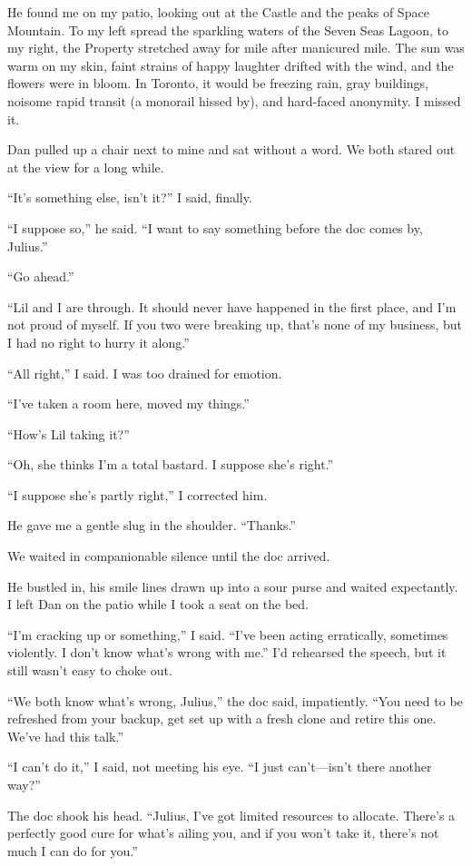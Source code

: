 He found me on my patio, looking out at the Castle and the peaks of
Space Mountain. To my left spread the sparkling waters of the Seven
Seas Lagoon, to my right, the Property stretched away for mile
after manicured mile. The sun was warm on my skin, faint strains of
happy laughter drifted with the wind, and the flowers were in
bloom. In Toronto, it would be freezing rain, gray buildings,
noisome rapid transit (a monorail hissed by), and hard-faced
anonymity. I missed it.

Dan pulled up a chair next to mine and sat without a word. We both
stared out at the view for a long while.

“It's something else, isn't it?” I said, finally.

“I suppose so,” he said. “I want to say something before the doc
comes by, Julius.”

“Go ahead.”

“Lil and I are through. It should never have happened in the first
place, and I'm not proud of myself. If you two were breaking up,
that's none of my business, but I had no right to hurry it along.”

“All right,” I said. I was too drained for emotion.

“I've taken a room here, moved my things.”

“How's Lil taking it?”

“Oh, she thinks I'm a total bastard. I suppose she's right.”

“I suppose she's partly right,” I corrected him.

He gave me a gentle slug in the shoulder. “Thanks.”

We waited in companionable silence until the doc arrived.

He bustled in, his smile lines drawn up into a sour purse and
waited expectantly. I left Dan on the patio while I took a seat on
the bed.

“I'm cracking up or something,” I said. “I've been acting
erratically, sometimes violently. I don't know what's wrong with
me.” I'd rehearsed the speech, but it still wasn't easy to choke
out.

“We both know what's wrong, Julius,” the doc said, impatiently.
“You need to be refreshed from your backup, get set up with a fresh
clone and retire this one. We've had this talk.”

“I can't do it,” I said, not meeting his eye. “I just can't—isn't
there another way?”

The doc shook his head. “Julius, I've got limited resources to
allocate. There's a perfectly good cure for what's ailing you, and
if you won't take it, there's not much I can do for you.”

